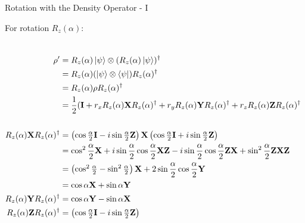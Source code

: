 \documentclass{beamer}
\begin{document}
\begin{frame}{Rotation with the Density Operator - I\tiny{\cite{rotationsonblochsphere}}}
  {\tiny
    For rotation $R_z(\alpha)$:
    \begin{columns}
    \begin{align*}
      \rho' &= R_z(\alpha)\ket{\psi} \otimes (R_z(\alpha)\ket{\psi})^{\dagger} \\
            &= R_z(\alpha)(\ket{\psi} \otimes \bra{\psi})R_z(\alpha)^{\dagger} \\
            &= R_z(\alpha) \rho R_z(\alpha)^{\dagger} \\
            &= \frac{1}2(\mathbf{I}  + r_x R_z(\alpha) \mathbf{X} R_z(\alpha)^{\dagger}
                                     + r_y R_z(\alpha) \mathbf{Y} R_z(\alpha)^{\dagger} 
                                     + r_z R_z(\alpha) \mathbf{Z} R_z(\alpha)^{\dagger} \\
      \\
      R_z(\alpha) \mathbf{X} R_z(\alpha)^{\dagger}
            &=    \begin{pmatrix} \cos\frac{\alpha}2\mathbf{I} - i\sin\frac{\alpha}2 \mathbf{Z} \end{pmatrix}
                  \mathbf{X}
                  \begin{pmatrix} \cos\frac{\alpha}2\mathbf{I} + i\sin\frac{\alpha}2 \mathbf{Z} \end{pmatrix} \\
            &=    \cos^2\frac{\alpha}2 \mathbf{X}
                + i\sin\frac{\alpha}2 \cos\frac{\alpha}2 \mathbf{X}\mathbf{Z}
                - i\sin\frac{\alpha}2 \cos\frac{\alpha}2 \mathbf{Z}\mathbf{X}
                + \sin^2\frac{\alpha}2 \mathbf{Z}\mathbf{X}\mathbf{Z} \\
            &=    \begin{pmatrix} \cos^2\frac{\alpha}2 -  \sin^2\frac{\alpha}2 \end{pmatrix} \mathbf{X}
                + 2 \sin\frac{\alpha}2 \cos\frac{\alpha}2 \mathbf{Y} \\
            &= \cos\alpha \mathbf{X} + \sin\alpha \mathbf{Y} \\
      R_z(\alpha) \mathbf{Y} R_z(\alpha)^{\dagger}
            &=    \cos\alpha \mathbf{Y} - \sin\alpha \mathbf{X} \\
      R_z(\alpha) \mathbf{Z} R_z(\alpha)^{\dagger}
            &=    \begin{pmatrix} \cos\frac{\alpha}2\mathbf{I} - i\sin\frac{\alpha}2 \mathbf{Z} \end{pmatrix}

\end{align*}
\end{columns}}
\end{frame}
\end{document}
